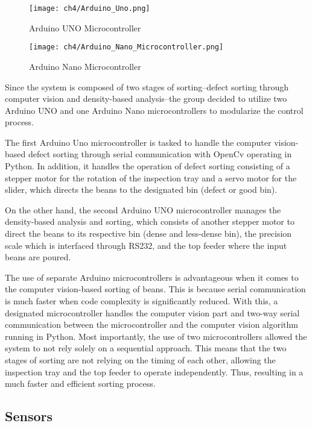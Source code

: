 \begin{figure}[H]
    \centering
    \texttt{[image: ch4/Arduino\_Uno.png]} %
    \caption{Arduino UNO Microcontroller}
    \label{fig:arduino_uno}
\end{figure}

\begin{figure}[H]
    \centering
    \texttt{[image: ch4/Arduino\_Nano\_Microcontroller.png]} %
    \caption{Arduino Nano Microcontroller}
    \label{fig:arduino_nano}
\end{figure}

Since the system is composed of two stages of sorting–defect sorting through computer vision and density-based analysis–the group decided to utilize two Arduino UNO and one Arduino Nano microcontrollers to modularize the control process. 

The first Arduino Uno microcontroller is tasked to handle the computer vision-based defect sorting through serial communication with OpenCv operating in Python. In addition, it handles the operation of defect sorting consisting of a stepper motor for the rotation of the inspection tray and a servo motor for the slider, which directs the beans to the designated bin (defect or good bin). 

On the other hand, the second Arduino UNO microcontroller manages the density-based analysis and sorting, which consists of another stepper motor to direct the beans to its respective bin (dense and less-dense bin), the precision scale which is interfaced through RS232, and the top feeder where the input beans are poured. 

The use of separate Arduino microcontrollers is advantageous when it comes to the computer vision-based sorting of beans. This is because serial communication is much faster when code complexity is significantly reduced. With this, a designated microcontroller handles the computer vision part and two-way serial communication between the microcontroller and the computer vision algorithm running in Python. Most importantly, the use of two microcontrollers allowed the system to not rely solely on a sequential approach. This means that the two stages of sorting are not relying on the timing of each other, allowing the inspection tray and the top feeder to operate independently. Thus, resulting in a much faster and efficient sorting process. 


\subsection{Sensors}

